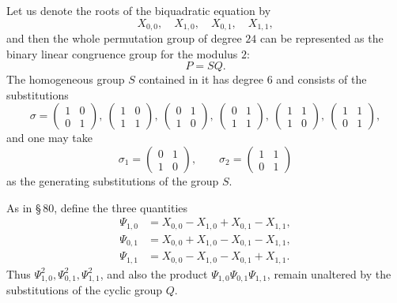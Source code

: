 \documentclass[11pt]{article}
\providecommand{\mat}[4]{\begin{pmatrix}#1&#2\\#3&#4\end{pmatrix}}
\providecommand{\mat}[4]{\begin{pmatrix}#1&#2\\#3&#4\end{pmatrix}}
\begin{document}
Let us denote the roots of the biquadratic equation by
\begin{equation}
 X_{0,0},\quad X_{1,0},\quad X_{0,1},\quad X_{1,1},
 \tag{1}
\end{equation}
and then the whole permutation group of degree $24$ can be represented as the binary linear congruence group for the modulus $2$:
\begin{equation}
 P=SQ.
 \tag{2}
\end{equation}
The homogeneous group $S$ contained in it has degree $6$ and consists of the substitutions
\begin{equation}
 \sigma=\mat{1}{0}{0}{1},\ \mat{1}{0}{1}{1},\ \mat{0}{1}{1}{0},\ \mat{0}{1}{1}{1},\ \mat{1}{1}{1}{0},\ \mat{1}{1}{0}{1},
 \tag{3}
\end{equation}
and one may take
\begin{equation}
 \sigma_1=\mat{0}{1}{1}{0},
 \qquad
 \sigma_2=\mat{1}{1}{0}{1}
 \tag{4}
\end{equation}
as the generating substitutions of the group $S$.

As in \S\,80, define the three quantities
\begin{equation}
\begin{aligned}
 \Psi_{1,0}&=X_{0,0}-X_{1,0}+X_{0,1}-X_{1,1},\\
 \Psi_{0,1}&=X_{0,0}+X_{1,0}-X_{0,1}-X_{1,1},\\
 \Psi_{1,1}&=X_{0,0}-X_{1,0}-X_{0,1}+X_{1,1}.
\end{aligned}
\tag{5}
\end{equation}
Thus $\Psi_{1,0}^2,\Psi_{0,1}^2,\Psi_{1,1}^2$, and also the product $\Psi_{1,0}\Psi_{0,1}\Psi_{1,1}$, remain unaltered by the substitutions of the cyclic group $Q$.
\end{document}
